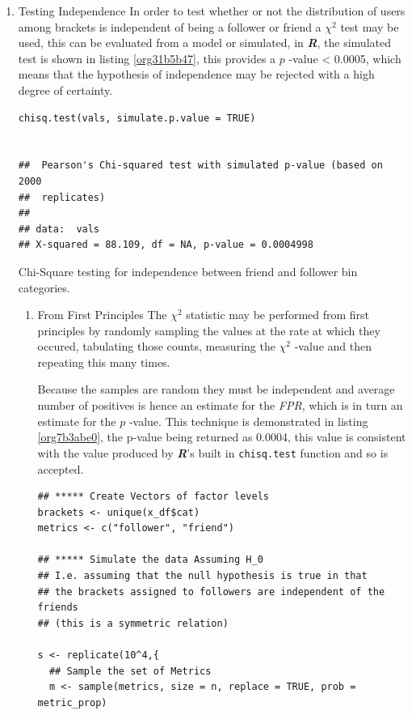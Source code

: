 \documentclass[11pt]{article}
\begin{document}
\begin{enumerate}
\item Testing Independence
\label{sec:org4432aeb}
In order to test whether or not the distribution of users among brackets is
independent of being a follower or friend a \(\chi^{2}\) test may be used, this
can be evaluated from a model or simulated, in \textbf{\emph{R}}, the simulated test is
shown in listing \ref{org31b5b47}, this provides a \(p\) -value < 0.0005, which means that the hypothesis of independence may be rejected with a high degree of certainty.

\begin{listing}[htbp]
\begin{verbatim}
chisq.test(vals, simulate.p.value = TRUE)


## 	Pearson's Chi-squared test with simulated p-value (based on 2000
## 	replicates)
##
## data:  vals
## X-squared = 88.109, df = NA, p-value = 0.0004998
\end{verbatim}
\caption{\label{org31b5b47}Chi-Square testing for independence between friend and follower bin categories.}
\end{listing}

\begin{enumerate}
\item From First Principles
\label{sec:org8285070}
The \(\chi^{2}\) statistic may be performed from first principles by randomly
sampling the values at the rate at which they occured, tabulating those counts, measuring the \(\chi^{2}\) -value and then repeating this many times.

Because the samples are random they must be independent and average number of
positives is hence an estimate for the \emph{FPR}, which is in turn an estimate for
the \(p\) -value. This technique is demonstrated in listing \ref{org7b3abe0}, the p-value
being returned as 0.0004, this value is consistent with the value produced by
\textbf{\emph{R}}'s built in \texttt{chisq.test} function and so is accepted.

\begin{listing}[htbp]
\begin{verbatim}
## ***** Create Vectors of factor levels
brackets <- unique(x_df$cat)
metrics <- c("follower", "friend")

## ***** Simulate the data Assuming H_0
## I.e. assuming that the null hypothesis is true in that
## the brackets assigned to followers are independent of the friends
## (this is a symmetric relation)

s <- replicate(10^4,{
  ## Sample the set of Metrics
  m <- sample(metrics, size = n, replace = TRUE, prob = metric_prop)


\end{verbatim}
\end{listing}
\end{enumerate}
\end{enumerate}
\end{document}
